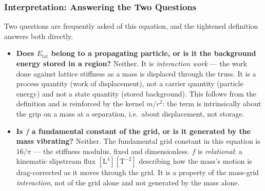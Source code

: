 \documentclass[12pt,oneside]{book}
\begin{document}
\begin{center}
\end{center}
 
\subsubsection{Interpretation: Answering the Two Questions}
 
Two questions are frequently asked of this equation, and the tightened definition answers
both directly.
 
\begin{itemize}
  \item \textbf{Does $E_{\mathrm{lat}}$ belong to a propagating particle, or is it the
  background energy stored in a region?} Neither. It is \emph{interaction work} --- the
  work done against lattice stiffness as a mass is displaced through the truss. It is a
  process quantity (work of displacement), not a carrier quantity (particle energy) and
  not a state quantity (stored background). This follows from the definition and is
  reinforced by the kernel $m/r^{2}$: the term is intrinsically about the grip on a mass
  at a separation, i.e.\ about displacement, not storage.
 
  \item \textbf{Is $f$ a fundamental constant of the grid, or is it generated by the mass
  vibrating?} Neither. The fundamental grid constant in this equation is $16/\pi$ --- the
  stiffness modulus, fixed and dimensionless. $f$ is \emph{relational}: a kinematic
  slipstream flux $[\mathrm{L}^{4}][\mathrm{T}^{-2}]$ describing how the mass's motion is
  drag-corrected as it moves through the grid. It is a property of the
  mass-grid \emph{interaction}, not of the grid alone and not generated by the mass alone.
\end{itemize}
 
\end{document}
